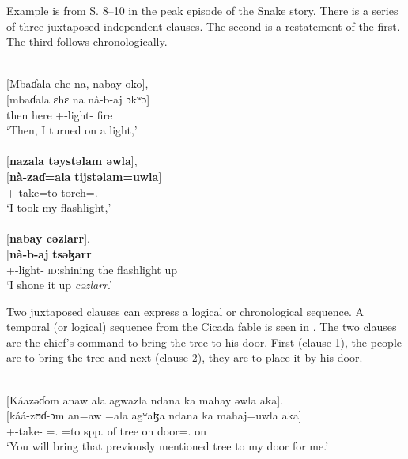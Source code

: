 Example  is from S. 8--10 in the peak episode of the Snake story. There is a series of three juxtaposed independent clauses. The second is a restatement of the first. The third follows chronologically. 

\ea \label{ex:12:65}\\
{}[Mbaɗala  ehe  na,  nabay  oko], \\
\gll  {}[mbaɗala ɛhɛ na nà-b-aj ɔkʷɔ]\\
      then     here {\PSP}  {\oneS}+{\PFV}-light{}-{\CL}     fire\\
\glt  ‘Then, I turned on a light,’\\

 \medskip{}\\
{}[\textbf{nazala  təystəlam  əwla}], \\
\gll  {}[\textbf{nà-zaɗ=ala}  \textbf{tijstəlam=uwla}]\\
      {\oneS}+{\PFV}-take=to     torch={\oneS}.{\POSS}\\
\glt  ‘I took my flashlight,’\\

 \medskip{}\\
{} [\textbf{nabay  cəzlarr}].\\
\gll  {}[\textbf{nà-b-aj}  \textbf{tsəɮarr}]\\
      {\oneS}+{\PFV}-light{}-{\CL}       \textsc{id}:shining the flashlight up\\
\glt  ‘I shone it up \textit{cəzlarr}.’
\z 

Two juxtaposed clauses can express a logical or chronological sequence. A temporal (or logical) sequence from the Cicada fable is seen in . The two clauses are the chief’s command to bring the tree to his door. First (clause 1), the people are to bring the tree and next (clause 2), they are to place it by his door. 

\ea \label{ex:12:66}
\\
{}[Káazəɗom  anaw  ala  agwazla  ndana  ka  mahay  əwla  aka].\\  
\gll {}[káá-zʊɗ{}-ɔm an=aw  =ala  agʷaɮa ndana ka mahaj=uwla aka] \\     
      {\twoP}+{\POT}-take-{\twoP}   {\DAT}={\oneS}.{\IO}  =to   {spp. of tree}    {\DEM}      on  door={\oneS}.{\POSS}   on \\     
\glt ‘You will bring that previously mentioned tree to my door for me.’\\

